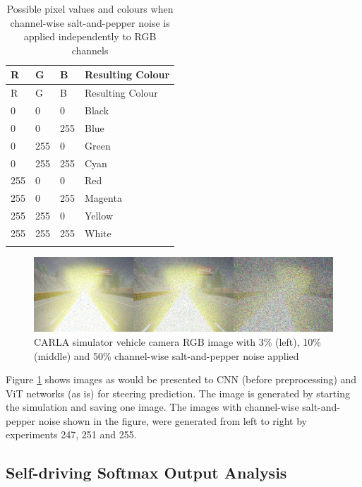 \begin{longtable}{@{}llll@{}}
\toprule
R & G & B & Resulting Colour \\
\midrule
\endfirsthead
\toprule
R & G & B & Resulting Colour \\
\midrule
\endhead
0 & 0 & 0 & Black \\
0 & 0 & 255 & Blue \\
0 & 255 & 0 & Green \\
0 & 255 & 255 & Cyan \\
255 & 0 & 0 & Red \\
255 & 0 & 255 & Magenta \\
255 & 255 & 0 & Yellow \\
255 & 255 & 255 & White \\
\bottomrule
\caption{Possible pixel values and colours when channel-wise salt-and-pepper noise is applied independently to RGB channels}
\label{tab:channel_wise_salt_pepper_colors}
\end{longtable}


\begin{figure}[H]
    \centering
    \includegraphics[width=1.0\linewidth]{Figures/Results/experiment-247-251-255-3pc-10pc-50pc-rbg-pepper-noise-combined.jpg}
    \caption{CARLA simulator vehicle camera RGB image with 3\% (left), 10\% (middle) and 50\% channel-wise salt-and-pepper noise applied}
    \label{fig:experiment-247-251-255-3pc-10pc-50pc-rbg-pepper-noise-combined}
\end{figure}

Figure \ref{fig:experiment-247-251-255-3pc-10pc-50pc-rbg-pepper-noise-combined} shows images as would be presented to CNN (before preprocessing) and ViT networks (as is) for steering prediction. The image is generated by starting the simulation and saving one image. The images with channel-wise salt-and-pepper noise shown in the figure, were generated from left to right by experiments 247, 251 and 255.

\subsection{Self-driving Softmax Output Analysis}

